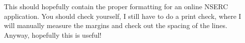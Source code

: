 \documentclass{article}
\begin{document}
\pagestyle{fancy}
\renewcommand{\headrulewidth}{0pt}
\singlespacing
This should hopefully contain the proper formatting for an online NSERC application. You should check yourself, I still have to do a print check, where I will manually measure the margins and check out the spacing of the lines. Anyway, hopefully this is useful!
\end{document}
